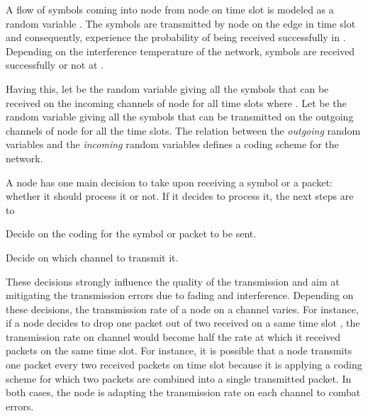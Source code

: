 \documentclass[a4paper]{article}
\begin{document}
A flow of symbols  coming into node  from node  on time slot  is modeled as a random variable . The symbols are transmitted by node  on the edge  in time slot  and consequently, experience the probability  of being received successfully in . Depending on the interference temperature of the network, symbols are received successfully or not at . 

Having this, let  be the random variable giving all the symbols that can be received on the incoming channels of node  for all time slots where . 
Let  be the random variable giving all the symbols that can be transmitted on the outgoing channels of node  for all the time slots. 
The relation between the \emph{outgoing} random variables  and the \emph{incoming} random variables   defines a coding scheme for the network.
 
A node has one main decision to take upon receiving a symbol or a packet: whether it should process it or not. If it decides to process it, the next steps are to


 Decide on the coding for the symbol or packet to be sent. 

 Decide on which channel to transmit it. 

These decisions strongly influence the quality of the transmission and aim at mitigating the transmission errors due to fading and interference. 
Depending on these decisions, the transmission rate of a node  on a channel  varies. For instance, if a node decides to drop one packet out of two received on a same time slot , the transmission rate on channel  would become half the rate at which it received packets on the same time slot. 
For instance, it is possible that a node transmits one packet every two received packets on time slot  because it is applying a coding scheme for which two packets are combined into a single transmitted packet. In both cases, the node is adapting the transmission rate on each channel to combat errors.   
\end{document}
